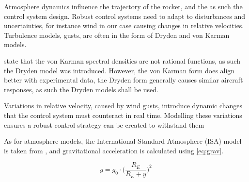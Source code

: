 
Atmosphere dynamics influence the trajectory of the rocket, and the as such the control system design. Robust control systems need to adapt to disturbances and uncertainties, for instance wind in our case causing changes in relative velocities. Turbulence models, gusts, are often in the form of Dryden and von Karman models.

\cite{Mulder2020} state that the von Karman spectral densities are not rational functions, as such the Dryden model was introduced. However, the von Karman form does align better with experimental data, the Dryden form generally causes similar aircraft responses, as such the Dryden models shall be used.

Variations in relative velocity, caused by wind gusts, introduce dynamic changes that the control system must counteract in real time. Modelling these variations ensures a robust control strategy can be created to withstand them

As for atmosphere models, the International Standard Atmosphere (ISA) model is taken from \cite{Anderson2020Introduction}, and gravitational acceleration is calculated using \autoref{eq:grav}.

\begin{equation}
    g = g_0 \cdot \bigg(\frac{R_{E}}{R_{E} + y}\bigg)^2
\label{eq:grav}
\end{equation}
